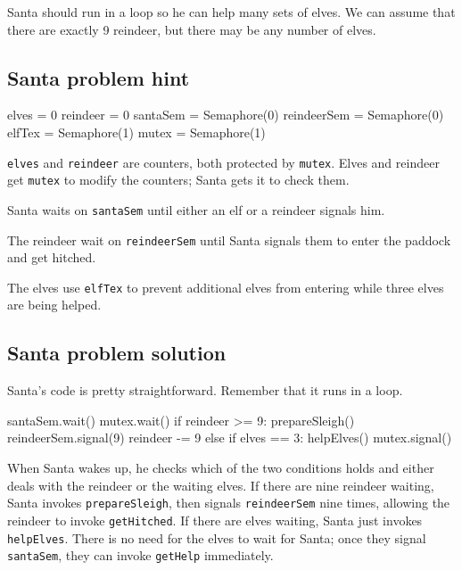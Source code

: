 \documentclass{book}
\begin{document}
Santa should run in a loop so he can help many sets of elves.
We can assume that there are exactly 9 reindeer, but there may
be any number of elves.



\subsection {Santa problem hint}

\begin{unbreakable}[title={Santa problem hint}]{}
elves = 0
reindeer = 0
santaSem = Semaphore(0)
reindeerSem = Semaphore(0)
elfTex = Semaphore(1)
mutex = Semaphore(1)
\end{unbreakable}

{\tt elves} and {\tt reindeer} are counters, both protected
by {\tt mutex}.  Elves and reindeer get {\tt mutex} to modify the
counters; Santa gets it to check them.

Santa waits on {\tt santaSem} until either an elf or a reindeer
signals him.

The reindeer wait on {\tt reindeerSem} until Santa signals them to
enter the paddock and get hitched.

The elves use {\tt elfTex} to prevent additional elves from
entering while three elves are being helped.



\subsection {Santa problem solution}

Santa's code is pretty straightforward.  Remember that it
runs in a loop.

\begin{unbreakable}[title={Santa problem solution (Santa)}]{}
santaSem.wait()
mutex.wait()
    if reindeer >= 9:
        prepareSleigh()
	reindeerSem.signal(9)
        reindeer -= 9
    else if elves == 3:
        helpElves()
mutex.signal()
\end{unbreakable}

When Santa wakes up, he checks which of the two conditions
holds and either deals with the reindeer or the waiting elves.
If there are nine reindeer waiting,
Santa invokes {\tt prepareSleigh}, then signals {\tt reindeerSem}
nine times, allowing the reindeer to invoke {\tt getHitched}.
If there are elves waiting, Santa just
invokes {\tt helpElves}.  There is no need for the elves to wait
for Santa; once they signal {\tt santaSem}, they can
invoke {\tt getHelp} immediately.
\end{document}
